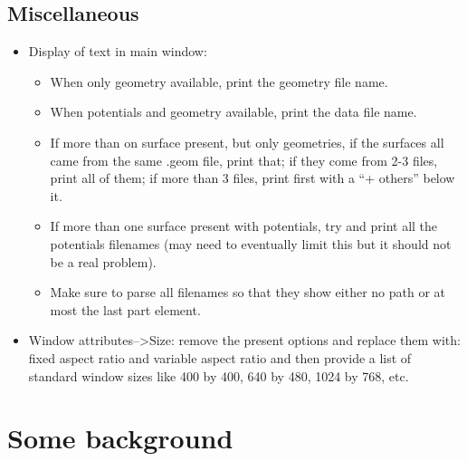 \documentclass[11pt]{article}
\begin{document}
\subsection{Miscellaneous}
\label{sec:misc}

\begin{itemize}
  \item Display of text in main window:
        \begin{itemize}
          \item When only geometry available, print the geometry file name.
          \item When potentials and geometry available, print the data file
                name. 
          \item If more than on surface present, but only geometries, if
                the surfaces all came from the same .geom file, print that;
                if they come from 2-3 files, print all of them; if more
                than 3 files, print first with a ``+ others'' below it.
          \item If more than one surface present with potentials, try and
                print all the potentials filenames (may need to eventually
                limit this but it should not be a real problem).
          \item Make sure to parse all filenames so that they show either
                no path or at most the last part element.
        \end{itemize}
  \item Window attributes-->Size: remove the present options and replace
        them with: fixed aspect ratio and variable aspect ratio and
        then provide a list of standard window sizes like 400 by 400,
        640 by 480, 1024 by 768, etc.
\end{itemize}


\section{Some background}

\end{document}
